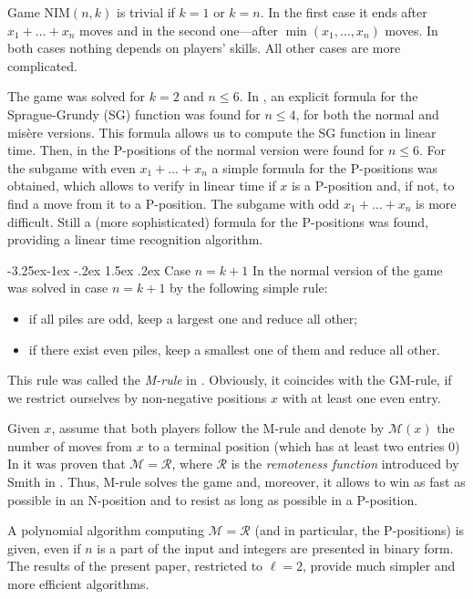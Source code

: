 \documentclass[10pt]{article}
\makeatletter
\renewcommand\subsection{\@startsection{subsection}{2}{\z@}
{-3.25ex\@plus -1ex \@minus -.2ex}
{1.5ex \@plus .2ex}
{\normalfont\normalsize\bfseries\boldmath}}
\theoremstyle{definition}
\def\R{\mathcal{R}}
\def\M{\mathcal{M}}
\makeatother
\begin{document}
Game NIM$(n,k)$  is trivial if  $k = 1$  or  $k = n$. 
In the first case it ends after $x_1 + \ldots + x_n$ moves  
and in the second one---after  $\min(x_1, \ldots, x_n)$ 
moves. In both cases nothing depends on players' skills. 
All other cases are more complicated. 

The game was solved for  $k=2$  and  $n \leq 6$.
In \cite{GHHC20}, an explicit formula 
for the Sprague-Grundy 
(SG) function was found for  $n \leq 4$, 
for both the normal and mis\`ere versions. 
This formula allows us to compute  the SG function in linear time. 
Then, in \cite{CGKPV21} the P-positions 
of the normal version were found for  $n \leq 6$.  
For the subgame with even  $x_1 + \ldots + x_n$ 
a simple formula for the P-positions was obtained, 
which allows to verify in linear time 
if  $x$ is a P-position and, if not, 
to find a move from it to a P-position.  
The subgame with odd  $x_1 + \ldots + x_n$ is more difficult. 
Still a (more sophisticated)  formula 
for the P-positions was found,  
providing a linear time recognition algorithm.

\subsection{Case $n = k+1$}
\label{ss01}
In \cite{GMMV23} the normal version of the game  
was solved in case $n = k+1$  by the following simple rule: 
\begin{itemize}
\item[(o)] if all piles are odd, 
keep a largest one and reduce all other;
\item[(e)] if there exist even piles, 
keep a smallest one of them and reduce all other.
\end{itemize}

This rule was called the {\em M-rule} in \cite{GMMV23}. 
Obviously, it coincides with the GM-rule,  
if we restrict ourselves 
by non-negative positions $x$  
with at least one even entry.

Given  $x$,  assume that both players follow the M-rule 
and  denote by $\M(x)$  the number of moves 
from  $x$  to a terminal position 
(which has at least two entries 0) 
In \cite{GMMV23} it was proven that  $\M = \R$, where 
$\R$  is the {\em remoteness function} 
introduced by Smith in \cite{Smi66}. 
Thus, M-rule solves the game and, moreover, 
it allows to win as fast as possible in an N-position and 
to resist as long as possible in a P-position.

A polynomial algorithm computing  $\M = \R$  
(and in particular, the P-positions) is given, 
even if $n$ is a part of the input and 
integers are presented in binary form.
The results of the present paper,  
restricted to $\ell = 2$, provide much simpler 
and more efficient algorithms.
\end{document}
